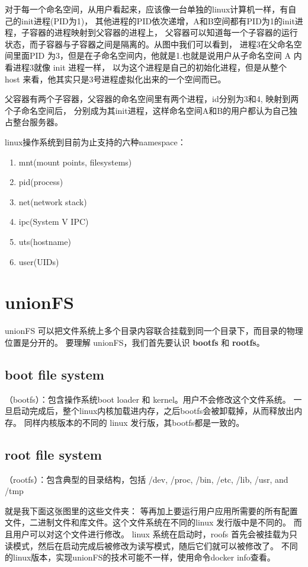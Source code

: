 对于每一个命名空间，从用户看起来，应该像一台单独的linux计算机一样，有自己的init进程(PID为1)，
其他进程的PID依次递增，A和B空间都有PID为1的init进程，子容器的进程映射到父容器的进程上，
父容器可以知道每一个子容器的运行状态，而子容器与子容器之间是隔离的。从图中我们可以看到，
进程3在父命名空间里面PID 为3，但是在子命名空间内，他就是1.也就是说用户从子命名空间 A 内看进程3就像 init 进程一样，
以为这个进程是自己的初始化进程，但是从整个 host 来看，他其实只是3号进程虚拟化出来的一个空间而已。

父容器有两个子容器，父容器的命名空间里有两个进程，id分别为3和4, 映射到两个子命名空间后，
分别成为其init进程，这样命名空间A和B的用户都认为自己独占整台服务器。

linux操作系统到目前为止支持的六种namespace：
\begin{enumerate}
    \item mnt(mount points, filesystems)
    \item pid(process)
    \item net(network stack)
    \item ipc(System V IPC)
    \item uts(hostname)
    \item user(UIDs)
\end{enumerate}

\section{unionFS}

unionFS 可以把文件系统上多个目录内容联合挂载到同一个目录下，而目录的物理位置是分开的。
要理解 unionFS，我们首先要认识 \textbf{bootfs} 和 \textbf{rootfs}。

\subsection{ boot file system}

（bootfs）：包含操作系统boot loader 和 kernel。用户不会修改这个文件系统。
一旦启动完成后，整个linux内核加载进内存，之后bootfs会被卸载掉，从而释放出内存。
同样内核版本的不同的 linux 发行版，其bootfs都是一致的。

\subsection{root file system}

（rootfs）：包含典型的目录结构，包括 /dev, /proc, /bin, /etc, /lib, /usr, and /tmp

就是我下面这张图里的这些文件夹：
等再加上要运行用户应用所需要的所有配置文件，二进制文件和库文件。这个文件系统在不同的linux 发行版中是不同的。
而且用户可以对这个文件进行修改。
linux 系统在启动时，roofs 首先会被挂载为只读模式，然后在启动完成后被修改为读写模式，随后它们就可以被修改了。
不同的linux版本，实现unionFS的技术可能不一样，使用命令docker info查看。

